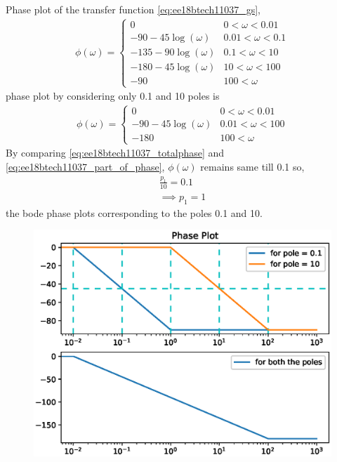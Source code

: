 \begin{enumerate}[label=\thesubsection.\arabic*.,ref=\thesubsection.\theenumi]
Phase plot of the transfer function \eqref{eq:ee18btech11037_gs},
\begin{align}
\label{eq:ee18btech11037_totalphase}
 \phi(\omega) = 
 \begin{cases} 
        0 & 0<\omega<0.01 \\
      -90-45\log(\omega)& 0.01<\omega<0.1 \\
      -135-90\log(\omega)& 0.1<\omega<10 \\
      -180-45\log(\omega)& 10<\omega<100 \\
      -90 & 100<\omega  
 \end{cases}
\end{align}
phase plot by considering only 0.1 and 10 poles is
\begin{align}
\label{eq:ee18btech11037_part_of_phase}
 \phi(\omega) = 
 \begin{cases} 
        0 & 0<\omega<0.01 \\
      -90-45\log(\omega)& 0.01<\omega<100 \\
      -180 & 100<\omega  
 \end{cases}
\end{align}
By comparing \ref{eq:ee18btech11037_totalphase} and \ref{eq:ee18btech11037_part_of_phase}, $\phi(\omega)$ remains
same till 0.1 so, 
\begin{align}
\frac{p_1}{10} = 0.1 \\
\implies p_1 = 1
\end{align}
the bode phase plots corresponding to the poles 0.1 and 10.
\begin{figure}[!ht]
\centering
\includegraphics[width=\columnwidth]{figs/ee18btech11037/ee18btech11037_2.eps}
\caption{}
\label{fig:ee18btech11037_2}
\end{figure}


\end{enumerate}
